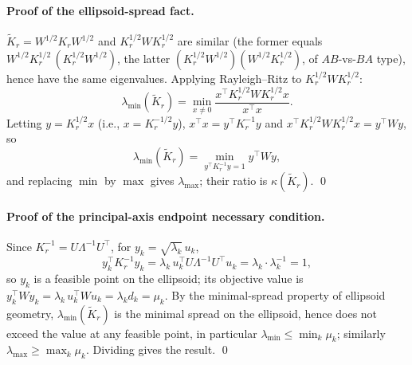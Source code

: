 \documentclass[11pt]{article}
\newcommand{\W}{W}
\numberwithin{equation}{section}
\begin{document}
\paragraph{Proof of the ellipsoid-spread fact.}
$\widetilde K_r=\W^{1/2}K_r\W^{1/2}$ and $K_r^{1/2}\W K_r^{1/2}$ are similar (the former equals $\W^{1/2}K_r^{1/2}\,(K_r^{1/2}\W^{1/2})$, the latter $(K_r^{1/2}\W^{1/2})(\W^{1/2}K_r^{1/2})$, of $AB$-vs-$BA$ type), hence have the same eigenvalues. Applying Rayleigh--Ritz to $K_r^{1/2}\W K_r^{1/2}$:
\[
\lambda_{\min}(\widetilde K_r)=\min_{x\ne0}\frac{x^\top K_r^{1/2}\W K_r^{1/2}x}{x^\top x}.
\]
Letting $y=K_r^{1/2}x$ (i.e., $x=K_r^{-1/2}y$), $x^\top x=y^\top K_r^{-1}y$ and $x^\top K_r^{1/2}\W K_r^{1/2}x=y^\top\W y$, so
\[
\lambda_{\min}(\widetilde K_r)=\min_{y^\top K_r^{-1}y=1}y^\top\W y,
\]
and replacing $\min$ by $\max$ gives $\lambda_{\max}$; their ratio is $\kappa(\widetilde K_r)$. \qed

\paragraph{Proof of the principal-axis endpoint necessary condition.}
Since $K_r^{-1}=U\Lambda^{-1}U^\top$, for $y_k=\sqrt{\lambda_k}\,u_k$,
\[
y_k^\top K_r^{-1}y_k=\lambda_k\,u_k^\top U\Lambda^{-1}U^\top u_k=\lambda_k\cdot\lambda_k^{-1}=1,
\]
so $y_k$ is a feasible point on the ellipsoid; its objective value is $y_k^\top\W y_k=\lambda_k\,u_k^\top\W u_k=\lambda_k d_k=\mu_k$. By the minimal-spread property of ellipsoid geometry, $\lambda_{\min}(\widetilde K_r)$ is the minimal spread on the ellipsoid, hence does not exceed the value at any feasible point, in particular $\lambda_{\min}\le\min_k\mu_k$; similarly $\lambda_{\max}\ge\max_k\mu_k$. Dividing gives the result. \qed
\end{document}
